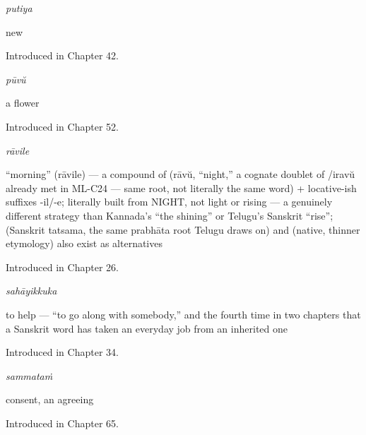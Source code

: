 \noindent\begin{minipage}[t]{\linewidth}
\raggedright
\textbf{}\enspace\emph{putiya}\par
\small new\par
\footnotesize Introduced in Chapter 42.
\end{minipage}\par\medskip

\noindent\begin{minipage}[t]{\linewidth}
\raggedright
\textbf{}\enspace\emph{pūvŭ}\par
\small a flower\par
\footnotesize Introduced in Chapter 52.
\end{minipage}\par\medskip

\noindent\begin{minipage}[t]{\linewidth}
\raggedright
\textbf{}\enspace\emph{rāvile}\par
\small \textquotedblleft{}morning\textquotedblright{} (rāvile) — a compound of  (rāvŭ, \textquotedblleft{}night,\textquotedblright{} a cognate doublet of /iravŭ already met in ML-C24 — same root, not literally the same word) + locative-ish suffixes -il/-e; literally built from NIGHT, not light or rising — a genuinely different strategy than Kannada's \textquotedblleft{}the shining\textquotedblright{} or Telugu's Sanskrit \textquotedblleft{}rise\textquotedblright{};  (Sanskrit tatsama, the same prabhāta root Telugu draws on) and  (native, thinner etymology) also exist as alternatives\par
\footnotesize Introduced in Chapter 26.
\end{minipage}\par\medskip

\noindent\begin{minipage}[t]{\linewidth}
\raggedright
\textbf{}\enspace\emph{sahāyikkuka}\par
\small to help — \textquotedblleft{}to go along with somebody,\textquotedblright{} and the fourth time in two chapters that a Sanskrit word has taken an everyday job from an inherited one\par
\footnotesize Introduced in Chapter 34.
\end{minipage}\par\medskip

\noindent\begin{minipage}[t]{\linewidth}
\raggedright
\textbf{}\enspace\emph{sammataṁ}\par
\small consent, an agreeing\par
\footnotesize Introduced in Chapter 65.
\end{minipage}\par\medskip

